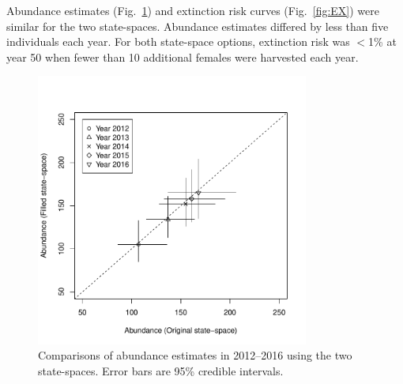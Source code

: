 \documentclass[12pt]{article}
\begin{document}
\clearpage


Abundance estimates (Fig.~\ref{fig:N}) and extinction risk curves
(Fig.~\ref{fig:EX}) were similar for the two state-spaces. Abundance
estimates differed by less than five individuals each year. For both
state-space options, extinction risk was $<$1\% at year 50 when fewer
than 10 additional females were harvested each year. 


\begin{figure}[h]
  \centering
  \includegraphics[width=0.8\textwidth]{figs/N_SS1vSS2} 
  \caption{Comparisons of abundance estimates in 2012--2016 using the
    two state-spaces. Error bars are 95\% credible intervals.}
  \label{fig:N}
\end{figure}


\end{document}
